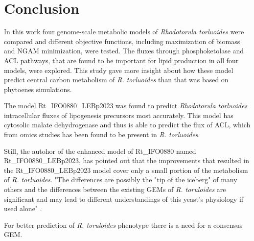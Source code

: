 \chapter{Conclusion}

In this work four genome-scale metabolic models of \textit{Rhodotorula torluoides} were compared and different objective functions, including maximization of biomass and NGAM minimization, 
were tested. The fluxes through phosphoketolase and ACL pathways, that are found to be important for lipid production in all four models, were explored. 
This study gave more insight about how these model predict central carbon metabolism of \textit{R. torluoides} than \cite{DeBiaggi2023} that was based on phytoenes simulations. %


The model Rt\_IFO0880\_LEBp2023 was found to predict \textit{Rhodotorula torluoides} intracellular fluxes of lipogenesis precursors most accurately.
This model has cytosolic malate dehydrogenase and thus is able to predict the flux of ACL, which from omics studies has been found to be present in \textit{R. torluoides}.

Still, the autohor of the enhanced model of Rt\_IFO0880 named Rt\_IFO0880\_LEBp2023, has pointed out that the improvements that resulted in the Rt\_IFO0880\_LEBp2023 
model cover only a small portion of the metabolism of \textit{R. torluoides}. "The differences are possibly the "tip of the iceberg" of many others and
the differences between the existing GEMs of \textit{R. toruloides} are significant and may lead to different understandings of
this yeast's physiology if used alone" \cite{DeBiaggi2023}.

For better prediction of \textit{R. toruloides} phenotype there is a need for a consensus GEM.

